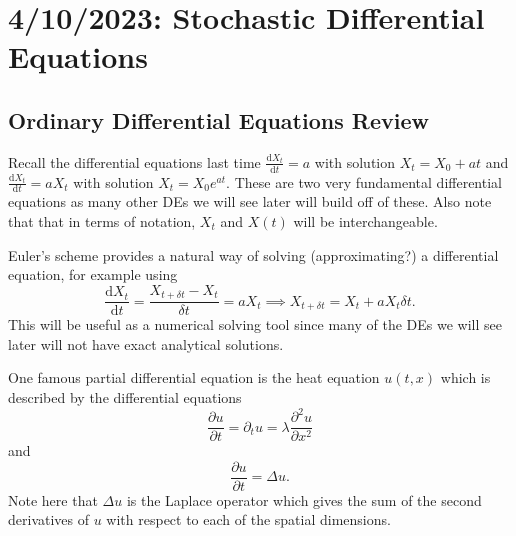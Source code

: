 \chapter{4/10/2023: Stochastic Differential Equations}

\section{Ordinary Differential Equations Review}
Recall the differential equations last time $\frac{\mathrm dX_t}{\mathrm dt} = a$ with solution $X_t = X_0+at$ and $\frac{\mathrm dX_t}{\mathrm dt} = aX_t$ with solution $X_t = X_0 e^{at}$. These are two very fundamental differential equations as many other DEs we will see later will build off of these. Also note that that in terms of notation, $X_t$ and $X(t)$ will be interchangeable.

Euler's scheme provides a natural way of solving (approximating?) a differential equation, for example using $$ \frac{\mathrm dX_t}{\mathrm dt} = \frac{X_{t+\delta t}-X_t}{\delta t} = aX_t\implies X_{t+\delta t} = X_t + aX_t\delta t. $$ This will be useful as a numerical solving tool since many of the DEs we will see later will not have exact analytical solutions.

One famous partial differential equation is the heat equation $u(t,x)$ which is described by the differential equations $$ \frac{\partial u}{\partial t} = \partial_t u = \lambda \frac{\partial^2 u}{\partial x^2} $$ and $$ \frac{\partial u}{\partial t} = \Delta u. $$ Note here that $\Delta u$ is the Laplace operator which gives the sum of the second derivatives of $u$ with respect to each of the spatial dimensions.


